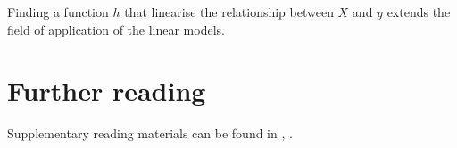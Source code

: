 Finding a function $h$ that linearise the relationship between $X$ and $y$ extends the field of application of the linear models.

\section*{Further reading}
Supplementary reading materials can be found in \cite{Skiena2017}, \cite{Igual2017}.


